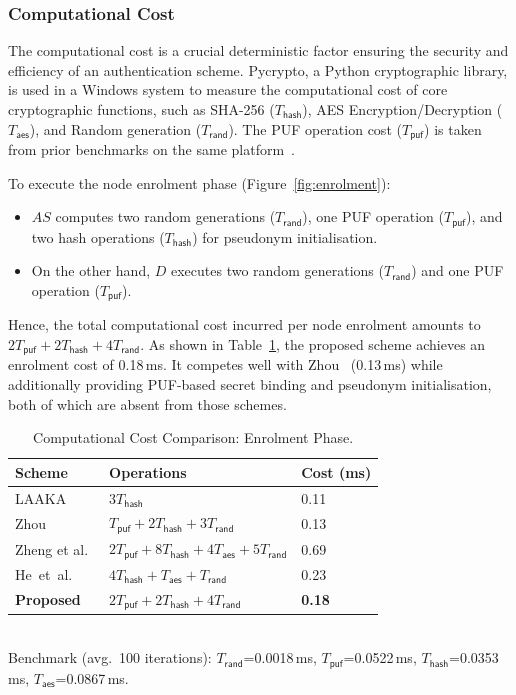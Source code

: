 \documentclass[conference]{IEEEtran}
\begin{document}
\subsubsection{Computational Cost}

The computational cost is a crucial deterministic factor ensuring the security and
efficiency of an authentication scheme. Pycrypto, a Python cryptographic library, is used
in a Windows system to measure the computational cost of core cryptographic functions,
such as SHA-256 ($T_{\mathsf{hash}}$), AES Encryption/Decryption ($T_{\mathsf{aes}}$),
and Random generation ($T_{\mathsf{rand}}$). The PUF operation cost ($T_{\mathsf{puf}}$)
is taken from prior benchmarks on the same platform~\cite{zheng2022puf}.

To execute the node enrolment phase (Figure~\ref{fig:enrolment}):
\begin{itemize}
  \item $AS$ computes two random generations ($T_{\mathsf{rand}}$), one PUF operation
        ($T_{\mathsf{puf}}$), and two hash operations ($T_{\mathsf{hash}}$) for pseudonym
        initialisation.
  \item On the other hand, $D$ executes two random generations ($T_{\mathsf{rand}}$) and
        one PUF operation ($T_{\mathsf{puf}}$).
\end{itemize}

Hence, the total computational cost incurred per node enrolment amounts to
$2T_{\mathsf{puf}} + 2T_{\mathsf{hash}} + 4T_{\mathsf{rand}}$.
As shown in Table~\ref{tab:comp_enroll}, the proposed scheme achieves an enrolment cost of
0.18\,ms. It competes well with Zhou~\cite{zhou2024auth} (0.13\,ms) while
additionally providing PUF-based secret binding and pseudonym initialisation, both of
which are absent from those schemes.

\begin{table}[!t]
  \centering
  \caption{Computational Cost Comparison: Enrolment Phase.}
  \label{tab:comp_enroll}
  \scriptsize
  \setlength{\tabcolsep}{3pt}
  \begin{tabular}{lll}
    \toprule
    Scheme & Operations & Cost (ms) \\
    \midrule
    LAAKA~\cite{ali2024laaka}      & $3T_\mathsf{hash}$ & 0.11 \\
    Zhou~\cite{zhou2024auth}      & $T_\mathsf{puf}+2T_\mathsf{hash}+3T_\mathsf{rand}$ & 0.13 \\
    Zheng et al.~\cite{zheng2022puf}      & $2T_\mathsf{puf}+8T_\mathsf{hash}+4T_\mathsf{aes}+5T_\mathsf{rand}$ & 0.69 \\
    He~et~al.~\cite{he2023lightweight}  & $4T_\mathsf{hash}+T_\mathsf{aes}+T_\mathsf{rand}$ & 0.23 \\
    \textbf{Proposed}        & $2T_\mathsf{puf}+2T_\mathsf{hash}+4T_\mathsf{rand}$ & \textbf{0.18} \\
    \bottomrule
  \end{tabular}\\[3pt]
  \scriptsize
  Benchmark (avg.\ 100 iterations): $T_\mathsf{rand}$=0.0018\,ms, $T_\mathsf{puf}$=0.0522\,ms,
  $T_\mathsf{hash}$=0.0353\,ms, $T_\mathsf{aes}$=0.0867\,ms.
\end{table}
\end{document}
